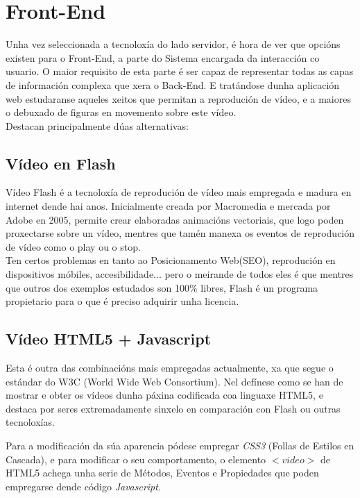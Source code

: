 	
\section{Front-End}
	Unha vez seleccionada a tecnoloxía do lado servidor, é hora de ver que opcións existen para
	o Front-End, a parte do Sistema encargada da interacción co usuario. O maior requisito de esta 
	parte é ser capaz de representar todas as capas de información complexa que xera o
	Back-End. E tratándose dunha aplicación web estudaranse aqueles xeitos que permitan
	a reprodución de vídeo, e a maiores o debuxado de figuras en movemento sobre este vídeo.\\
	
	Destacan principalmente dúas alternativas:
	
	\subsection{Vídeo en Flash}
		Vídeo Flash é a tecnoloxía de reprodución de vídeo mais empregada e madura en
		internet dende hai anos. Inicialmente creada por Macromedia e mercada por Adobe 
		en 2005, permite crear elaboradas animacións vectoriais, que logo poden proxectarse
		sobre un vídeo, mentres que tamén manexa os eventos de reprodución de vídeo como o 
		play ou o stop.\\
		
		Ten certos problemas en tanto ao Posicionamento Web(SEO), reprodución en 
		dispositivos móbiles, accesibilidade... pero o meirande de todos eles é que mentres
		que outros dos exemplos estudados son 100\% libres, Flash é un programa propietario
		para o que é preciso adquirir unha licencia.		
		
	
	\subsection{Vídeo HTML5 + Javascript}
		Esta é outra das combinacións mais empregadas actualmente, xa que segue o estándar
		do W3C (World Wide Web Consortium)\cite{w3schools-video-tag}. Nel defínese como se
		han de mostrar e obter os vídeos dunha páxina codificada coa linguaxe HTML5, e 
		destaca por seres extremadamente sinxelo en comparación con Flash ou outras tecnoloxías.
		
		Para a modificación da súa aparencia pódese empregar \emph{CSS3} (Follas de Estilos en 
		Cascada), e para modificar o seu comportamento, o elemento $<video>$ de HTML5 achega
		unha serie de Métodos, Eventos e Propiedades\cite{w3school-video-events} que poden
		empregarse dende código \emph{Javascript}.
		
